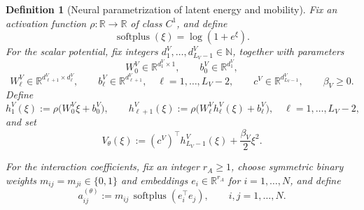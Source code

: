 \documentclass[11pt]{article}
\newtheorem{definition}{Definition}
\newcommand{\N}{\mathbb{N}}
\newcommand{\R}{\mathbb{R}}
\newcommand{\softplus}{\operatorname{softplus}}
\begin{document}
\begin{definition}[Neural parametrization of latent energy and mobility]\label{def:neural-param}
Fix an activation function \(\rho:\R\to \R\) of class \(C^1\), and define
\begin{equation}\label{eq:softplus}
\softplus(\xi)=\log(1+e^{\xi}).
\end{equation}
For the scalar potential, fix integers \(d_1^V,\dots,d_{L_V-1}^V\in \N\), together with parameters
\begin{equation}\label{eq:V-params}
W_0^V\in \R^{d_1^V\times 1}, \qquad b_0^V\in \R^{d_1^V},
\end{equation}
\begin{equation*}
W_{\ell}^V\in \R^{d_{\ell+1}^V\times d_{\ell}^V}, \qquad b_{\ell}^V\in \R^{d_{\ell+1}^V}, \quad \ell=1,\dots,L_V-2,
\qquad c^V\in \R^{d_{L_V-1}^V}, \qquad \beta_V\ge 0.
\end{equation*}
Define
\begin{equation}\label{eq:V-hidden}
h_1^V(\xi):=\rho\bigl(W_0^V\xi+b_0^V\bigr), \qquad
h_{\ell+1}^V(\xi):=\rho\bigl(W_{\ell}^V h_{\ell}^V(\xi)+b_{\ell}^V\bigr), \quad \ell=1,\dots,L_V-2,
\end{equation}
and set
\begin{equation}\label{eq:V-mlp}
V_{\theta}(\xi):=(c^V)^\top h_{L_V-1}^V(\xi)+\frac{\beta_V}{2}\xi^2.
\end{equation}

For the interaction coefficients, fix an integer \(r_A\ge 1\), choose symmetric binary weights
\(m_{ij}=m_{ji}\in \{0,1\}\) and embeddings \(e_i\in \R^{r_A}\) for \(i=1,\dots,N\), and define
\begin{equation}\label{eq:A-param}
a_{ij}^{(\theta)}:=m_{ij}\,\softplus(e_i^\top e_j), \qquad i,j=1,\dots,N.
\end{equation}


\end{definition}
\end{document}
